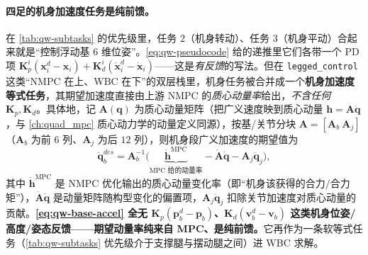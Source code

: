 \paragraph{四足的机身加速度任务是纯前馈。}
在 \cref{tab:qw-subtasks} 的优先级里，任务 $2$（机身转动）、任务 $3$（机身平动）合起来就是“控制浮动基 $6$ 维位姿”。\cref{eq:qw-pseudocode} 给的递推里它们各带一个 PD 项 $\boldsymbol{K}_p^i(\boldsymbol{x}_i^d-\boldsymbol{x}_i)+\boldsymbol{K}_d^i(\dot{\boldsymbol{x}}_i^d-\dot{\boldsymbol{x}}_i)$——这是\emph{有反馈}的写法。但在 \texttt{legged\_control} 这类“NMPC 在上、WBC 在下”的双层栈里，机身任务被合并成一个\textbf{机身加速度等式任务}，其期望加速度直接由上游 NMPC 的\emph{质心动量率}给出，\emph{不含任何 $\boldsymbol{K}_p,\boldsymbol{K}_d$}。具体地，记 $\boldsymbol{A}(\boldsymbol{q})$ 为质心动量矩阵（把广义速度映到质心动量 $\boldsymbol{h}=\boldsymbol{A}\dot{\boldsymbol{q}}$，与 \cref{ch:quad_mpc} 质心动力学的动量定义同源），按基/关节分块 $\boldsymbol{A}=[\boldsymbol{A}_b\ \boldsymbol{A}_j]$（$\boldsymbol{A}_b$ 为前 $6$ 列、$\boldsymbol{A}_j$ 为后 $12$ 列），则机身段广义加速度的期望值为
\begin{equation}
  \ddot{\boldsymbol{q}}_b^{des}=\boldsymbol{A}_b^{-1}\Big(\underbrace{\dot{\boldsymbol{h}}^{\mathrm{MPC}}}_{\text{MPC 给的动量率}}-\dot{\boldsymbol{A}}\dot{\boldsymbol{q}}-\boldsymbol{A}_j\ddot{\boldsymbol{q}}_j\Big),
  \label{eq:qw-base-accel}
\end{equation}
其中 $\dot{\boldsymbol{h}}^{\mathrm{MPC}}$ 是 NMPC 优化输出的质心动量变化率（即“机身该获得的合力/合力矩”），$\dot{\boldsymbol{A}}\dot{\boldsymbol{q}}$ 是动量矩阵随构型变化的偏置项，$\boldsymbol{A}_j\ddot{\boldsymbol{q}}_j$ 扣除关节加速度对质心动量的贡献。\textbf{\cref{eq:qw-base-accel} 全无 $\boldsymbol{K}_p(\boldsymbol{p}_b^d-\boldsymbol{p}_b)$、$\boldsymbol{K}_d(\boldsymbol{v}_b^d-\boldsymbol{v}_b)$ 这类机身位姿/高度/姿态反馈——期望动量率纯来自 MPC、是纯前馈。}它再作为一条软等式任务（\cref{tab:qw-subtasks} 优先级介于支撑腿与摆动腿之间）进 WBC 求解。

